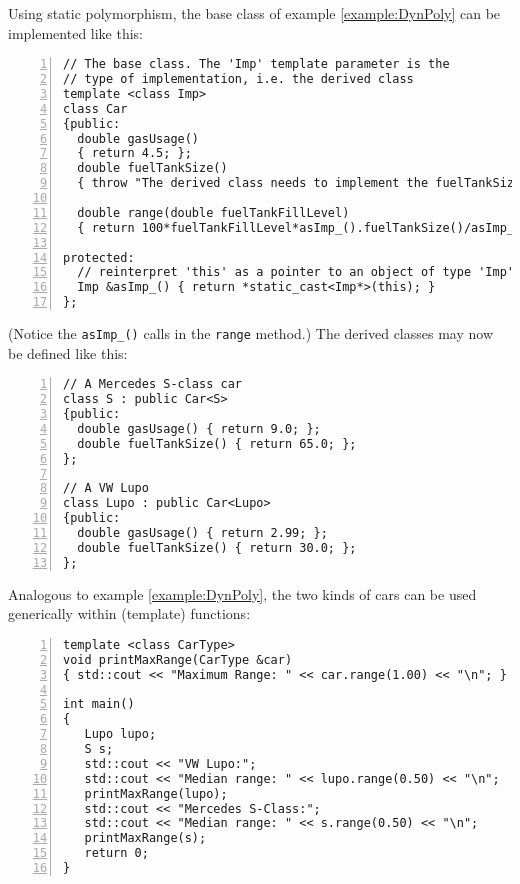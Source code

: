 \begin{example}
  Using static polymorphism, the base class of example \ref{example:DynPoly}
  can be implemented like this:
\begin{lstlisting}[name=staticcars,basicstyle=\ttfamily\scriptsize,numbers=left,numberstyle=\tiny, numbersep=5pt]
// The base class. The 'Imp' template parameter is the
// type of implementation, i.e. the derived class 
template <class Imp>
class Car
{public:
  double gasUsage() 
  { return 4.5; };
  double fuelTankSize() 
  { throw "The derived class needs to implement the fuelTankSize() method"; };
  
  double range(double fuelTankFillLevel) 
  { return 100*fuelTankFillLevel*asImp_().fuelTankSize()/asImp_().gasUsage(); }

protected:
  // reinterpret 'this' as a pointer to an object of type 'Imp'
  Imp &asImp_() { return *static_cast<Imp*>(this); }
};
\end{lstlisting}
(Notice the \texttt{asImp\_()} calls in the \texttt{range} method.) The
derived classes may now be defined like this:
\begin{lstlisting}[name=staticcars,basicstyle=\ttfamily\scriptsize,numbers=left,numberstyle=\tiny, numbersep=5pt]
// A Mercedes S-class car
class S : public Car<S>
{public:
  double gasUsage() { return 9.0; };
  double fuelTankSize() { return 65.0; };
};

// A VW Lupo
class Lupo : public Car<Lupo>
{public:
  double gasUsage() { return 2.99; };
  double fuelTankSize() { return 30.0; };
};
\end{lstlisting}
\end{example}

\noindent
Analogous to example \ref{example:DynPoly}, the two kinds of cars can
be used generically within (template) functions:
\begin{lstlisting}[name=staticcars,basicstyle=\ttfamily\scriptsize,numbers=left,numberstyle=\tiny, numbersep=5pt]
template <class CarType>
void printMaxRange(CarType &car)
{ std::cout << "Maximum Range: " << car.range(1.00) << "\n"; }

int main()
{
   Lupo lupo;
   S s;
   std::cout << "VW Lupo:";
   std::cout << "Median range: " << lupo.range(0.50) << "\n";
   printMaxRange(lupo);
   std::cout << "Mercedes S-Class:";
   std::cout << "Median range: " << s.range(0.50) << "\n";
   printMaxRange(s);
   return 0;
}
\end{lstlisting}


